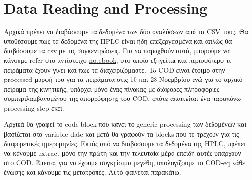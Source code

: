 \documentclass[11pt]{article}
\begin{document}
\section{Data Reading and Processing}
\label{sec:org3a2f586}
Αρχικά πρέπει να διαβάσουμε τα δεδομένα των δύο αναλύσεων από τα CSV τους. Θα υποθέσουμε πως τα δεδομένα της HPLC είναι ήδη επεξεργασμένα και απλώς θα διαβάσουμε τα csv με τις συγκεντρώσεις. Για να παραχθούν αυτά, μπορούμε να κάνουμε refer στο αντίστοιχο \href{./hplc\_analysis\_notebook.org}{notebook}, στο οποίο εξηγείται και περισσότερο τι πειράματα έχουν γίνει και πως τα διαχειριζόμαστε. To COD είναι έτοιμο στην processed μορφή του για τα πειράματα στις 10 και 28 Νοεμβρίου ενώ για το αρχικό πείραμα της κινητικής, υπάρχει μόνο ένας πίνακας με διάφορες πληροφορίες συμπεριλαμβανομένου της απορρόφησης του COD, οπότε απαιτείται ένα παραπάνω processing step εκεί.

Αρχικά θα γραφεί το code block που κάνει το generic processing των δεδομένων και βασίζεται στο variable date και μετά θα γραφούν τα blocks που το τρέχουν για τις διαφορετικές ημερομηνίες. Εκτός από να διαβάσουμε τα δεδομένα της HPLC, πρέπει να κάνουμε extract μόνο την πρώτη και την τελευταία μέρα επειδή αυτές υπάρχουν στο COD. Έπειτα, για να έχουμε συγκρίσιμα μεγέθη, υπολογίζουμε το COD-eq κάθε ένωσης και κάνουμε τις μετατροπές. Αυτό φαίνεται παρακάτω. 
\end{document}
